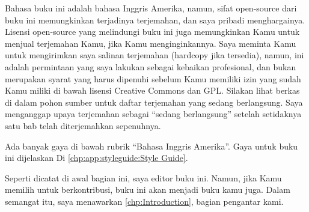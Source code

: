 Bahasa buku ini adalah bahasa Inggris Amerika, namun, sifat open-source
dari buku ini memungkinkan terjadinya terjemahan, dan saya pribadi
menghargainya.
Lisensi open-source yang melindungi buku ini juga memungkinkan Kamu
untuk menjual terjemahan Kamu, jika Kamu menginginkannya.
Saya meminta Kamu untuk mengirimkan saya salinan terjemahan (hardcopy jika
tersedia), namun, ini adalah permintaan yang saya lakukan sebagai
kebaikan profesional, dan bukan merupakan syarat yang harus dipenuhi
sebelum Kamu memiliki izin yang sudah Kamu miliki di bawah lisensi
Creative Commons dan GPL\@.
Silakan lihat berkas  di dalam pohon sumber untuk daftar
terjemahan yang sedang berlangsung.
Saya menganggap upaya terjemahan sebagai ``sedang berlangsung'' setelah
setidaknya satu bab telah diterjemahkan sepenuhnya.

Ada banyak gaya di bawah rubrik ``Bahasa Inggris Amerika''.
Gaya untuk buku ini dijelaskan Di
\cref{chp:app:styleguide:Style Guide}.

Seperti dicatat di awal bagian ini, saya editor buku ini.
Namun, jika Kamu memilih untuk berkontribusi, buku ini akan menjadi buku
kamu juga.
Dalam semangat itu, saya menawarkan \cref{chp:Introduction}, bagian
pengantar kami.


